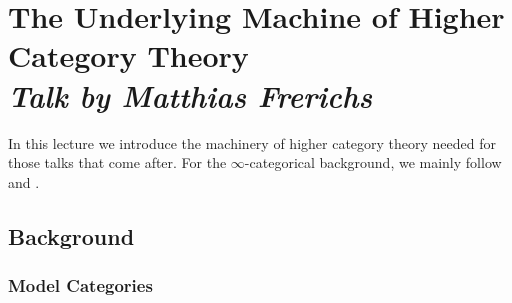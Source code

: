\documentclass[a4paper]{book}
\theoremstyle{definition}
\theoremstyle{remark}
\numberwithin{equation}{section}
\begin{document}
\chapter{The Underlying Machine of Higher Category Theory \texorpdfstring{\\}{ } \normalsize \emph{Talk by Matthias Frerichs}}

In this lecture we introduce the machinery of higher category theory needed for those talks that come after. For the $\infty$-categorical background, we mainly follow \cite{lurie2009htt} and \cite{land2021introduction}. 

\section{Background}

\subsection{Model Categories}
\end{document}

